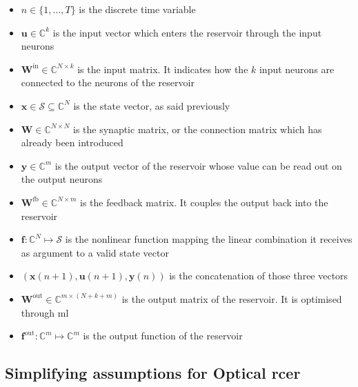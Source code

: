 \begin{itemize}
	\item $n \in \{1, \dots, T\}$ is the discrete time variable
	\item $\mathbf{u} \in \mathbb{C}^k$ is the input vector which enters the reservoir through the input neurons
	\item $\mathbf{W}^{\text{in}} \in \mathbb{C}^{N \times k}$ is the input matrix. It indicates how the $k$ input neurons are connected to the neurons of the reservoir
	\item $\mathbf{x} \in \mathcal{S} \subseteq \mathbb{C}^{N}$ is the state vector, as said previously
	\item $\mathbf{W} \in \mathbb{C}^{N \times N}$ is the synaptic matrix, or the connection matrix which has already been introduced
	\item $\mathbf{y} \in \mathbb{C}^{m}$ is the output vector of the reservoir whose value can be read out on the output neurons
	\item $\mathbf{W}^{\text{fb}} \in \mathbb{C}^{N \times m}$ is the feedback matrix. It couples the output back into the reservoir
	\item $\mathbf{f}: \mathbb{C}^N \mapsto \mathcal{S}$ is the nonlinear function mapping the linear combination it receives as argument to a valid state vector
	\item $\left(\mathbf{x}(n+1), \mathbf{u}(n+1), \mathbf{y}(n)\right)$ is the concatenation of those three vectors
	\item $\mathbf{W}^{\text{out}} \in \mathbb{C}^{m \times (N+k+m)}$ is the output matrix of the reservoir. It is optimised through \gls{ml}
	\item $\mathbf{f}^{\text{out}} : \mathbb{C}^{m} \mapsto \mathbb{C}^{m}$ is the output function of the reservoir
\end{itemize}

\subsection{Simplifying assumptions for Optical \acrshort{rcer}}

